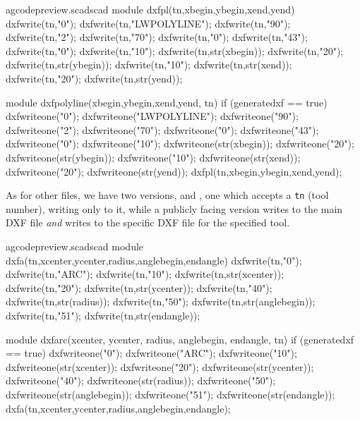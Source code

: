 \documentclass{ltxdoc}
\begin{document}
\lstset{firstnumber=\thegcpscad}
\begin{writecode}{a}{gcodepreview.scad}{scad}
module dxfpl(tn,xbegin,ybegin,xend,yend) {
    dxfwrite(tn,"0");
    dxfwrite(tn,"LWPOLYLINE");
    dxfwrite(tn,"90");
    dxfwrite(tn,"2");
    dxfwrite(tn,"70");
    dxfwrite(tn,"0");
    dxfwrite(tn,"43");
    dxfwrite(tn,"0");
    dxfwrite(tn,"10");
    dxfwrite(tn,str(xbegin));
    dxfwrite(tn,"20");
    dxfwrite(tn,str(ybegin));
    dxfwrite(tn,"10");
    dxfwrite(tn,str(xend));
    dxfwrite(tn,"20");
    dxfwrite(tn,str(yend));
}

module dxfpolyline(xbegin,ybegin,xend,yend, tn) {
if (generatedxf == true) {
    dxfwriteone("0");
    dxfwriteone("LWPOLYLINE");
    dxfwriteone("90");
    dxfwriteone("2");
    dxfwriteone("70");
    dxfwriteone("0");
    dxfwriteone("43");
    dxfwriteone("0");
    dxfwriteone("10");
    dxfwriteone(str(xbegin));
    dxfwriteone("20");
    dxfwriteone(str(ybegin));
    dxfwriteone("10");
    dxfwriteone(str(xend));
    dxfwriteone("20");
    dxfwriteone(str(yend));
    dxfpl(tn,xbegin,ybegin,xend,yend);
    }
}

\end{writecode}
\addtocounter{gcpscad}{41}

As for other files, we have two versions,  and , 
one which accepts a \texttt{tn} (tool number), writing only to it, while a publicly facing version 
writes to the main DXF file \emph{and} writes to the specific DXF file for the specified tool.

\lstset{firstnumber=\thegcpscad}
\begin{writecode}{a}{gcodepreview.scad}{scad}
module dxfa(tn,xcenter,ycenter,radius,anglebegin,endangle) {
    dxfwrite(tn,"0");
    dxfwrite(tn,"ARC");
    dxfwrite(tn,"10");
    dxfwrite(tn,str(xcenter));
    dxfwrite(tn,"20");
    dxfwrite(tn,str(ycenter));
    dxfwrite(tn,"40");
    dxfwrite(tn,str(radius));
    dxfwrite(tn,"50");
    dxfwrite(tn,str(anglebegin));
    dxfwrite(tn,"51");
    dxfwrite(tn,str(endangle));
}

module dxfarc(xcenter, ycenter, radius, anglebegin, endangle, tn) {
if (generatedxf == true) {
    dxfwriteone("0");
    dxfwriteone("ARC");
    dxfwriteone("10");
    dxfwriteone(str(xcenter));
    dxfwriteone("20");
    dxfwriteone(str(ycenter));
    dxfwriteone("40");
    dxfwriteone(str(radius));
    dxfwriteone("50");
    dxfwriteone(str(anglebegin));
    dxfwriteone("51");
    dxfwriteone(str(endangle));
    dxfa(tn,xcenter,ycenter,radius,anglebegin,endangle);
    }
}

\end{writecode}
\addtocounter{gcpscad}{33}
 
\end{document}
